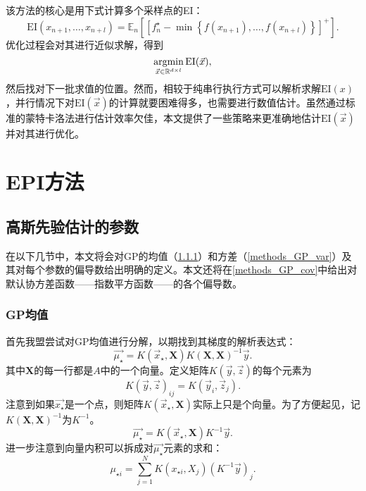 \documentclass[index]{subfiles}
\begin{document}
该方法的核心是用下式计算多个采样点的EI：
\begin{equation}
 \mbox{EI}(x_{n+1}, \ldots, x_{n+l}) = \mathbb{E}_{n}\left[\left[f_{n}^{\star} - \min\left\{f(x_{n+1}), \ldots, f(x_{n+l})\right\}\right]^{+}\right].
\end{equation}
优化过程会对其进行近似求解，得到
\begin{equation}
 \operatorname*{argmin}_{\vec{x} \in \mathbb{R}^{d \times l}} \mbox{EI}(\vec{x}),
\end{equation}
然后找对下一批求值的位置。然而，相较于纯串行执行方式可以解析求解$\mbox{EI}(x)$，并行情况下对$\mbox{EI}(\vec{x})$的计算就要困难得多，也需要进行数值估计。虽然通过标准的蒙特卡洛法进行估计效率欠佳，本文提供了一些策略来更准确地估计$\mbox{EI}(\vec{x})$并对其进行优化。


\section{EPI方法} %
\label{cha:EPI Methods}

\subsection{高斯先验估计的参数}
\label{comp_of_gp}

在以下几节中，本文将会对GP的均值（\cref{methods_GP_mean}）和方差（\cref{methods_GP_var}）及其对每个参数的偏导数给出明确的定义。本文还将在\cref{methods_GP_cov}中给出对默认协方差函数——指数平方函数——的各个偏导数。

\subsubsection{GP均值}
\label{methods_GP_mean}

首先我盟尝试对GP均值进行分解，以期找到其梯度的解析表达式：
\begin{equation}
 \vec{\mu_{\star}} = K(\vec{x}_{\star}, \textbf{X} )K(\textbf{X},\textbf{X})^{-1}\vec{y}.
\end{equation}
其中$\textbf{X}$的每一行都是$A$中的一个向量。定义矩阵$K(\vec{y}, \vec{z})$的每个元素为
\begin{equation}
    K(\vec{y}, \vec{z})_{ij} = K(\vec{y}_{i}, \vec{z}_{j}).
\end{equation}
注意到如果$\vec{x_{\star}}$是一个点，则矩阵$K(\vec{x}_{\star}, \textbf{X} )$实际上只是个向量。为了方便起见，记$K(\textbf{X},\textbf{X})^{-1}$为$K^{-1}$。
\begin{equation}
 \vec{\mu_{\star}} = K(\vec{x}_{\star}, \textbf{X} ) K^{-1} \vec{y}.
\end{equation}
进一步注意到向量内积可以拆成对$\vec{\mu_{\star}}$元素的求和：
\begin{equation}
 \mu_{\star {i}} = \sum_{j = 1}^{N} K(x_{\star i}, X_{j}) \left(K^{-1} \vec{y} \right)_{j}.
\end{equation}
\end{document}
